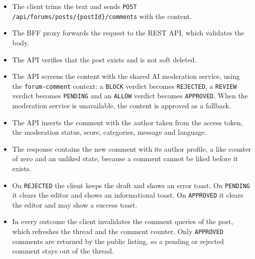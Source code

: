 \begin{itemize}[leftmargin=1.6em,topsep=3pt,itemsep=2pt,parsep=0pt,label=$\bullet$]
      \item The client trims the text and sends \texttt{POST
                  /api/forums/posts/\{postId\}/comments} with the content.
      \item The BFF proxy forwards the request to the REST API, which validates the body.
      \item The API verifies that the post exists and is not soft deleted.
      \item The API screens the content with the shared AI moderation service, using the
            \texttt{forum-comment} context: a \texttt{BLOCK} verdict becomes
            \texttt{REJECTED}, a \texttt{REVIEW} verdict becomes \texttt{PENDING} and an
            \texttt{ALLOW} verdict becomes \texttt{APPROVED}. When the moderation service
            is unavailable, the content is approved as a fallback.
      \item The API inserts the comment with the author taken from the access token, the
            moderation status, score, categories, message and language.
      \item The response contains the new comment with its author profile, a like counter
            of zero and an unliked state, because a comment cannot be liked before it
            exists.
      \item On \texttt{REJECTED} the client keeps the draft and shows an error toast. On
            \texttt{PENDING} it clears the editor and shows an informational toast. On
            \texttt{APPROVED} it clears the editor and may show a success toast.
      \item In every outcome the client invalidates the comment queries of the post, which
            refreshes the thread and the comment counter. Only \texttt{APPROVED} comments
            are returned by the public listing, so a pending or rejected comment stays out
            of the thread.
\end{itemize}

